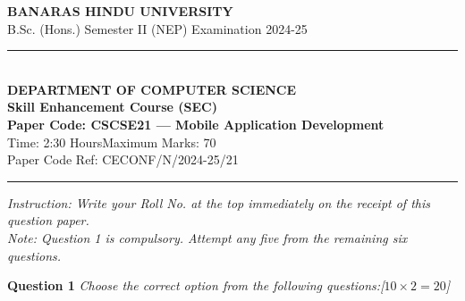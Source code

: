 \documentclass[11pt,a4paper]{article}
\newcommand{\pts}[1]{\hfill   \textit{[#1]}}
\begin{document}
\begin{center}
  {\large\bfseries BANARAS HINDU UNIVERSITY}\\[2pt]
  {\normalsize B.Sc. (Hons.) Semester II (NEP) Examination 2024-25}\\[6pt]
  \rule{0.8\linewidth}{0.5pt}\\[6pt]
  {\large\bfseries DEPARTMENT OF COMPUTER SCIENCE}\\[4pt]
  {\large\bfseries Skill Enhancement Course (SEC)}\\[4pt]
  {\large\bfseries Paper Code: CSCSE21 --- Mobile Application Development}\\[4pt]
  {\normalsize Time: 2:30 Hours\hfill Maximum Marks: 70}\\[2pt]
  {\small Paper Code Ref: CECONF/N/2024-25/21}
\end{center}

\rule{\linewidth}{0.4pt}\smallskip



\noindent   \textit{Instruction: Write your Roll No. at the top immediately on the receipt of this question paper.}\\[2pt]



\noindent   \textit{Note: Question 1 is compulsory. Attempt any five from the remaining six questions.}
\bigskip




\noindent   \textbf{Question 1}   \textit{Choose the correct option from the following questions:}\pts{$10  \times 2 = 20$}
\end{document}
